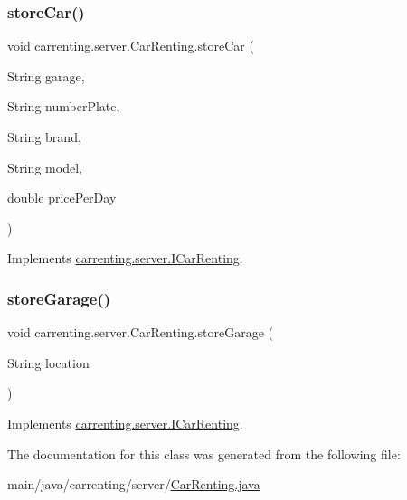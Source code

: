 \mbox{\label{classcarrenting_1_1server_1_1_car_renting_a4a562c581946a77d814f10ee7c53b3f5}} 
\subsubsection{\texorpdfstring{storeCar()}{storeCar()}}
{\footnotesize\ttfamily void carrenting.\+server.\+Car\+Renting.\+store\+Car (\begin{DoxyParamCaption}\item[{String}]{garage,  }\item[{String}]{number\+Plate,  }\item[{String}]{brand,  }\item[{String}]{model,  }\item[{double}]{price\+Per\+Day }\end{DoxyParamCaption})}



Implements \mbox{\hyperlink{interfacecarrenting_1_1server_1_1_i_car_renting_a45afd537059a13920f8ed9f91865b871}{carrenting.\+server.\+I\+Car\+Renting}}.

\mbox{\label{classcarrenting_1_1server_1_1_car_renting_a00e1951eeaff747c8a601d586b3fb8e9}} 
\subsubsection{\texorpdfstring{storeGarage()}{storeGarage()}}
{\footnotesize\ttfamily void carrenting.\+server.\+Car\+Renting.\+store\+Garage (\begin{DoxyParamCaption}\item[{String}]{location }\end{DoxyParamCaption})}



Implements \mbox{\hyperlink{interfacecarrenting_1_1server_1_1_i_car_renting_a2a6b576363c023ef94615f58d7305222}{carrenting.\+server.\+I\+Car\+Renting}}.



The documentation for this class was generated from the following file\+:\begin{DoxyCompactItemize}
\item 
main/java/carrenting/server/\mbox{\hyperlink{_car_renting_8java}{Car\+Renting.\+java}}\end{DoxyCompactItemize}
